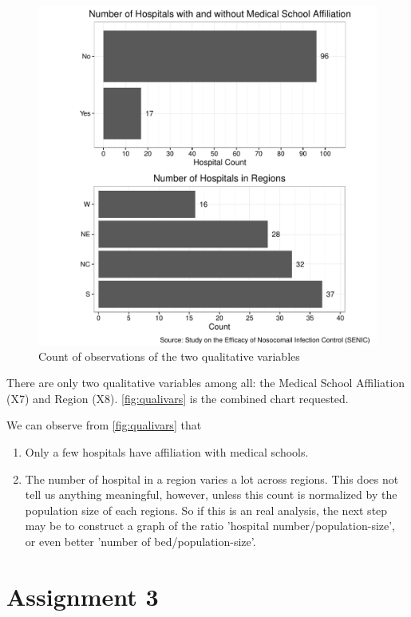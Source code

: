 \documentclass[11pt]{article}
\begin{document}
\begin{figure}[H]
  \centering
  \includegraphics[scale=0.8]{qualitative_vars.pdf}
  \caption{Count of observations of the two
    qualitative variables}
  \label{fig:qualivars}
\end{figure}

There are only two qualitative variables among all: the Medical School
Affiliation (X7) and Region (X8). \autoref{fig:qualivars} is the combined
chart requested.

We can observe from \autoref{fig:qualivars} that
\begin{enumerate}
\item
  Only a few hospitals have affiliation with medical schools.
\item
  The number of hospital in a region varies a lot across regions. This
  does not tell us anything meaningful, however, unless this count is
  normalized by the population size of each regions. So if this is an
  real analysis, the next step may be to construct a graph of the ratio
  'hospital number/population-size', or even better
  'number of bed/population-size'.
\end{enumerate}


\section{Assignment 3}
\end{document}
